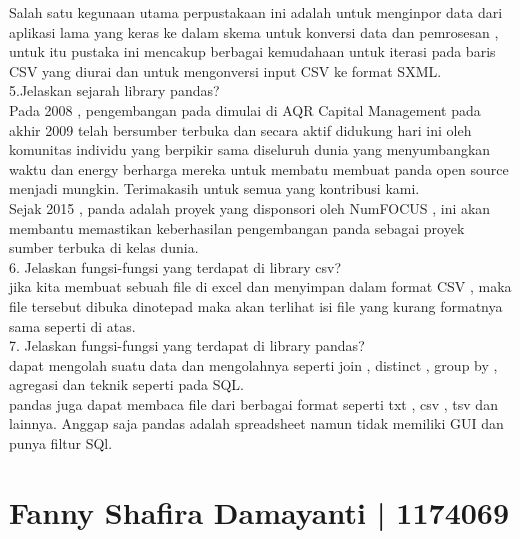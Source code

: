 Salah satu kegunaan utama perpustakaan ini adalah untuk menginpor data dari aplikasi lama yang keras ke dalam skema untuk konversi data dan pemrosesan , untuk itu pustaka ini mencakup berbagai kemudahaan  untuk iterasi pada baris CSV yang diurai dan untuk mengonversi input CSV ke format SXML.\\

5.Jelaskan sejarah library pandas?\\
Pada 2008 , pengembangan pada dimulai di AQR Capital Management
pada akhir 2009 telah bersumber terbuka dan secara aktif didukung hari ini oleh komunitas individu yang berpikir sama diseluruh dunia yang menyumbangkan waktu dan energy berharga mereka untuk membatu membuat panda open source menjadi mungkin. Terimakasih untuk semua yang kontribusi kami.\\

Sejak 2015 , panda adalah proyek yang disponsori oleh NumFOCUS , ini akan membantu memastikan keberhasilan pengembangan panda sebagai proyek sumber terbuka di kelas dunia.\\

6. Jelaskan fungsi-fungsi yang terdapat di library csv?\\
jika kita membuat sebuah file di excel dan menyimpan dalam format CSV , maka file tersebut dibuka dinotepad maka akan terlihat isi file yang kurang formatnya sama seperti di atas.\\

7. Jelaskan fungsi-fungsi yang terdapat di library pandas?\\
dapat mengolah suatu data dan mengolahnya seperti join , distinct , group by , agregasi dan teknik seperti pada SQL.\\

pandas juga dapat membaca file dari berbagai format seperti txt , csv , tsv dan lainnya. Anggap saja pandas adalah spreadsheet namun tidak memiliki GUI dan punya filtur SQl.\\


\section{Fanny Shafira Damayanti | 1174069}
